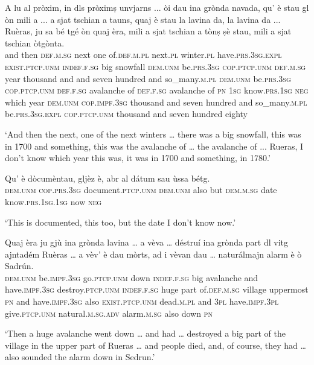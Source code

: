 \begin{linenumbers}
\gll    A lu al pròxim, in dls pròximṣ unvjarns ... òi dau ina grònda navada, qu’ è stau gl òn mili a ... a sjat tschian a tauns, quaj è stau la lavina da, la lavina da ... Ruèras, ju sa bé tgé òn quaj èra, mili a sjat tschian a tònṣ ṣè stau, mili a sjat tschian òtgònta.\\
and then \textsc{def.m.sg} next one of.\textsc{def.m.pl} next.\textsc{pl} winter.\textsc{pl} {} have.\textsc{prs.3sg}.\textsc{expl} \textsc{exist.ptcp.unm} \textsc{indef.f.sg} big snowfall \textsc{dem.unm} be.\textsc{prs.3sg} \textsc{cop.ptcp.unm} \textsc{def.m.sg} year thousand and {} and seven hundred and so\_many.\textsc{m.pl} \textsc{dem.unm} be.\textsc{prs.3sg} \textsc{cop.ptcp.unm} \textsc{def.f.sg} avalanche of \textsc{def.f.sg} avalanche of {} \textsc{pn} \textsc{1sg}  know.\textsc{prs.1sg} \textsc{neg} which year \textsc{dem.unm} \textsc{cop.impf.3sg} thousand and seven hundred and so\_many.\textsc{m.pl} be.\textsc{prs.3sg}.\textsc{expl} \textsc{cop.ptcp.unm} thousand and seven hundred eighty\\
\end{linenumbers}
\medskip 
\glt `And then the next, one of the next winters … there was a big snowfall, this was in 1700 and something, this was the avalanche of … the avalanche of ... Rueras, I don’t know which year this was, it was in 1700 and something, in 1780.'
\medskip

\begin{linenumbers}
\gll Qu’ è dòcumèntau, gljèz è, abr al dátum sau ùssa bétg.\\
\textsc{dem.unm} \textsc{cop.prs.3sg} document.\textsc{ptcp.unm} \textsc{dem.unm} also but \textsc{dem.m.sg} date know.\textsc{prs.1sg.1sg} now \textsc{neg}\\
\end{linenumbers}
\medskip
\glt `This is documented, this too, but the date I don’t know now.' 

\begin{linenumbers}
\gll    Quaj èra ju gjù ina grònda lavina … a vèva … déstruí ina grònda part dl vitg ajntadém Ruèras … a vèv’ è dau mòrts, ad i vèvan dau … naturálmajn alarm è ò Sadrún.\\
\textsc{dem.unm} be.\textsc{impf.3sg} go.\textsc{ptcp.unm} down \textsc{indef.f.sg} big avalanche {} and have.\textsc{impf.3sg} {} destroy.\textsc{ptcp.unm} \textsc{indef.f.sg} huge part of.\textsc{def.m.sg} village uppermost \textsc{pn} {} and have.\textsc{impf.3sg} also \textsc{exist.ptcp.unm} dead.\textsc{m.pl} and \textsc{3pl} have.\textsc{impf.3pl} give.\textsc{ptcp.unm} {} natural.\textsc{m.sg.adv} alarm.\textsc{m.sg} also down \textsc{pn}\\
\end{linenumbers}
\medskip
\glt `Then a huge avalanche went down … and had … destroyed a big part of the village in the upper part of Rueras … and people died, and, of course, they had … also sounded the alarm down in Sedrun.'
\medskip

